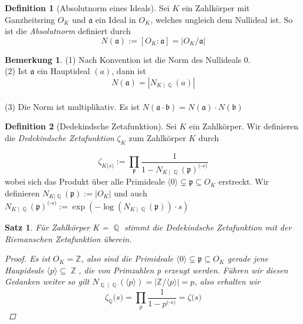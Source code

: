 \documentclass[10pt,a4paper]{article}
\theoremstyle{plain}
\newtheorem{satz}[thm]{Satz}
\theoremstyle{definition}
\newtheorem{defn}{Definition}[section]
\newtheorem*{note}{Bemerkung}
\theoremstyle{remark}
\DeclareMathOperator{\Q}{\mathbb{Q}}
\DeclareMathOperator{\Z}{\mathbb{Z}}
\begin{document}
\begin{defn}[Absolutnorm eines Ideals]

Sei $\textit{K}$ ein Zahlkörper mit Ganzheitsring $O_{K}$ und $\mathfrak{a}$ ein Ideal in $O_{K}$, welches ungleich dem Nullideal ist. So ist die \textit{Absolutnorm} definiert durch $$N(\mathfrak{a}) := [O_{K} : \mathfrak{a} ] = \vert O_{K} / \mathfrak{a} \vert $$

\end{defn}

\begin{note}
(1) Nach Konvention ist die Norm des Nullideals 0.
\\
(2) Ist $\mathfrak{a}$ ein Hauptideal $(a)$, dann ist $$N(\mathfrak{a}) = |N_{K\mid \Q}(a)|$$
\\
(3) Die Norm ist multiplikativ. Es ist $N(\mathfrak{a}\cdot \mathfrak{b}) = N(\mathfrak{a})\cdot N(\mathfrak{b})$

\end{note}

\begin{defn}[Dedekindsche Zetafunktion]

Sei $\textit{K}$ ein Zahlkörper. Wir definieren die \textit{Dedekindsche Zetafunktion} \textit{$\zeta_{\textit{K}}$} zum Zahlkörper $\textit{K}$ durch
	
$$\zeta_{\textit{K} \textit{(s)}}:= \prod_{\mathfrak{p}}\frac{1}{1- N_{\textit{K}\mid\Q}(\mathfrak{p})^\textit{(-s)}}$$
wobei sich das Produkt über alle Primideale $\langle0\rangle\subsetneq \mathfrak{p} \subseteq O_{\textit{K}}$ erstreckt. Wir definieren $N_{\textit{K}|\Q}(\mathfrak{p}) := | O_{\textit{K}}|$ und auch $N_{\textit{K}\mid\Q}(\mathfrak{p})^\textit{(-s)}:=\exp(-\log(N_{\textit{K}\mid\Q}(\mathfrak{p}))\cdot \textit{s})$

\end{defn}

\begin{satz}

Für Zahlkörper \textit{K} = $\Q$ stimmt die Dedekindsche Zetafunktion mit der Riemanschen Zetafunktion überein.

\begin{proof}
Es ist $O_\textit{K} = \mathbb{Z}$, also sind die Primideale $\langle0\rangle\subsetneq \mathfrak{p} \subseteq O_{\textit{K}}$ gerade jene Haupideale $\langle \textit{p}\rangle\subseteq\Z$, die von Primzahlen \textit{p} erzeugt werden. Führen wir diesen Gedanken weiter so gilt $N_{\Q\mid\Q}(\langle \textit{p}\rangle) = | \mathbb{Z}/\langle \textit{p}\rangle| = \textit{p}$, also erhalten wir  $$\zeta_{\Q} \textit{(s)}= \prod_{\textit{p}} \frac{1}{1-\textit{p}^\textit{(-s)}} = \zeta \textit{(s)} $$

\end{proof}

\end{satz}
\end{document}
